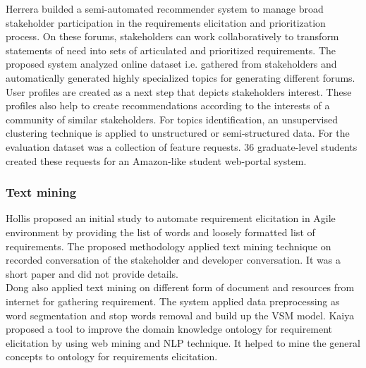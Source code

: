 Herrera \etal \cite{Castro-Herrera:2009} builded a semi-automated recommender system
to manage broad stakeholder participation in the requirements elicitation
and prioritization process. On these forums, stakeholders can work collaboratively to transform statements of
need into sets of articulated and prioritized requirements. The proposed system analyzed online dataset i.e. gathered
from stakeholders and automatically generated highly specialized topics for generating different forums. User profiles are created as a next step that depicts stakeholders interest. These profiles also help to create recommendations according to the interests of a community of similar stakeholders. For topics
identification, an unsupervised clustering technique is applied to unstructured or semi-structured data. 
For the evaluation dataset was a collection of feature requests. 36 graduate-level students created these requests for an Amazon-like student web-portal system.\\


\subsubsection{Text mining}


Hollis \etal \cite{Hollis2017} proposed an initial study to automate requirement
elicitation in Agile environment by providing the list of words and loosely
formatted list of requirements. The proposed methodology applied text mining
technique on recorded conversation of the stakeholder and developer
conversation. It was a short paper and did not provide details.\\

Dong \etal \cite{dong2010} also applied text mining on different form of
document and resources from internet for gathering requirement. The system
applied data preprocessing as word segmentation and stop words removal and build
up the VSM model. Kaiya \etal \cite{Kaiya:2010} proposed a tool to improve the
domain knowledge ontology for requirement elicitation by using web mining and
NLP technique. It helped to mine the general concepts to ontology for
requirements elicitation.


